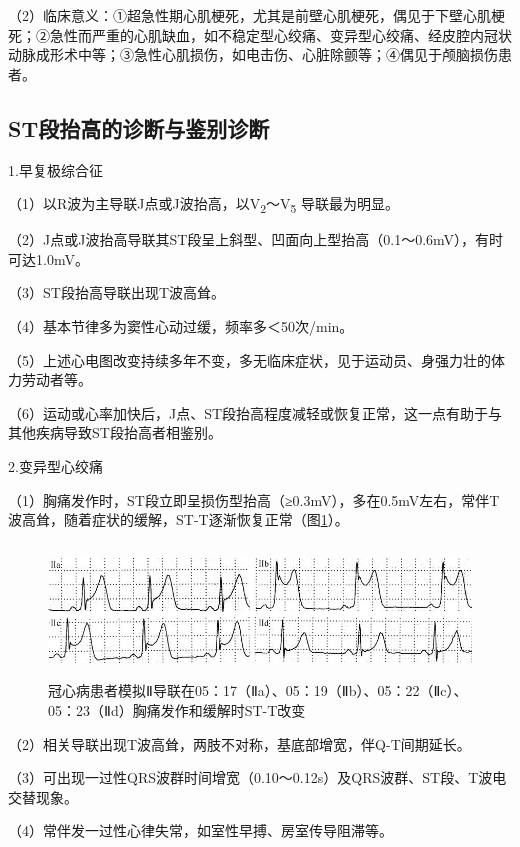 （2）临床意义：①超急性期心肌梗死，尤其是前壁心肌梗死，偶见于下壁心肌梗死；②急性而严重的心肌缺血，如不稳定型心绞痛、变异型心绞痛、经皮腔内冠状动脉成形术中等；③急性心肌损伤，如电击伤、心脏除颤等；④偶见于颅脑损伤患者。

\protect\hypertarget{text00011.htmlux5cux23subid79}{}{}

\subsection{ST段抬高的诊断与鉴别诊断}

1.早复极综合征

（1）以R波为主导联J点或J波抬高，以V\textsubscript{2}～V\textsubscript{5} 导联最为明显。

（2）J点或J波抬高导联其ST段呈上斜型、凹面向上型抬高（0.1～0.6mV），有时可达1.0mV。

（3）ST段抬高导联出现T波高耸。

（4）基本节律多为窦性心动过缓，频率多＜50次/min。

（5）上述心电图改变持续多年不变，多无临床症状，见于运动员、身强力壮的体力劳动者等。

（6）运动或心率加快后，J点、ST段抬高程度减轻或恢复正常，这一点有助于与其他疾病导致ST段抬高者相鉴别。

2.变异型心绞痛

（1）胸痛发作时，ST段立即呈损伤型抬高（≥0.3mV），多在0.5mV左右，常伴T波高耸，随着症状的缓解，ST-T逐渐恢复正常（图\ref{fig5-7}）。

\begin{figure}[!htbp]
 \centering
 \includegraphics[width=5.58333in,height=1.38542in]{./images/Image00088.jpg}
 \captionsetup{justification=centering}
 \caption{冠心病患者模拟Ⅱ导联在05：17（Ⅱa）、05：19（Ⅱb）、05：22（Ⅱc）、05：23（Ⅱd）胸痛发作和缓解时ST-T改变}
 \label{fig5-7}
  \end{figure} 

（2）相关导联出现T波高耸，两肢不对称，基底部增宽，伴Q-T间期延长。

（3）可出现一过性QRS波群时间增宽（0.10～0.12s）及QRS波群、ST段、T波电交替现象。

（4）常伴发一过性心律失常，如室性早搏、房室传导阻滞等。

